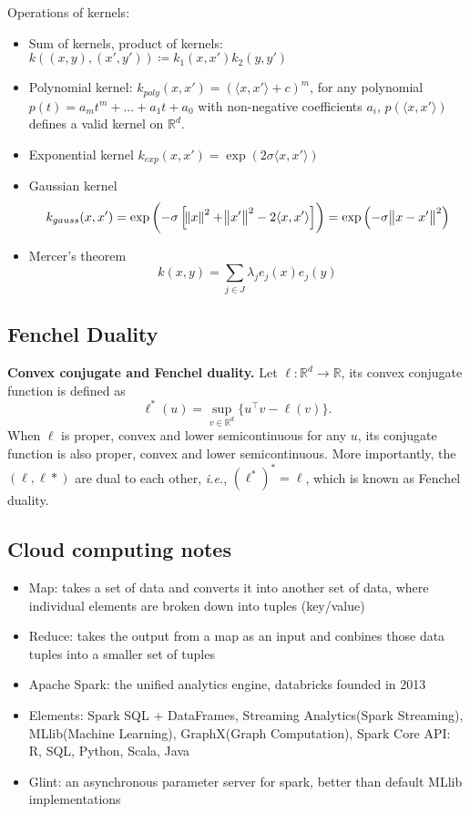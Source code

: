 \documentclass[12pt, letterpaper]{article}
\begin{document}
Operations of kernels:
\begin{itemize}
	\item Sum of kernels, product of kernels: $k((x, y), (x', y')) \coloneqq k_1(x, x')k_2 (y,y')$
	\item Polynomial kernel: $k_{poly}(x,x')=(\langle x,x' \rangle +c )^m$, for any polynomial $p(t) = a_m t^m + ... + a_1 t + a_0$ with non-negative coefficients $a_i$, $p(\langle x,x' \rangle)$ defines a valid kernel on $\mathbb{R}^d$.
	\item Exponential kernel $k_{exp}(x, x')=\exp (2 \sigma \langle x,x' \rangle)$
	\item Gaussian kernel 
	\begin{equation}
		k_{gauss}(x, x')=\exp \left( -\sigma \left[ \norm{x}^2 + \norm{x'}^2 - 2 \langle x,x' \rangle \right] \right) = \exp \left( -\sigma \norm{x-x'}^2 \right)
	\end{equation}
	\item Mercer's theorem
	\begin{equation}
		k(x,y) = \sum_{j \in J} \lambda_j e_j (x) e_j (y)
	\end{equation}
\end{itemize}

\subsection{Fenchel Duality}

\textbf{Convex conjugate and Fenchel duality.} Let $\ell : \mathbb{R}^d \rightarrow \mathbb{R}$, its convex conjugate function is defined as
\begin{equation}
	\ell^{*}(u) = \sup_{v \in \mathbb{R}^d} \{ u^\intercal v - \ell (v) \}.
\end{equation}
When $\ell$ is proper, convex and lower semicontinuous for any $u$, its conjugate function is also proper, convex and lower semicontinuous. More importantly, the $(\ell, \ell*)$ are dual to each other, \emph{i.e.}, $(\ell^*)^* = \ell$, which is known as Fenchel duality. \cite{Hiriart2012} \cite{Ryan2007}


\subsection{Cloud computing notes}
\begin{itemize}
	\item Map: takes a set of data and converts it into another set of data, where individual elements are broken down into tuples (key/value)
	\item Reduce: takes the output from a map as an input and conbines those data tuples into a smaller set of tuples
	\item Apache Spark: the unified analytics engine, databricks founded in 2013
	\item Elements: Spark SQL + DataFrames, Streaming Analytics(Spark Streaming), MLlib(Machine Learning), GraphX(Graph Computation), Spark Core API: R, SQL, Python, Scala, Java
	\item Glint: an asynchronous parameter server for spark, better than default MLlib implementations
\end{itemize}



\end{document}
